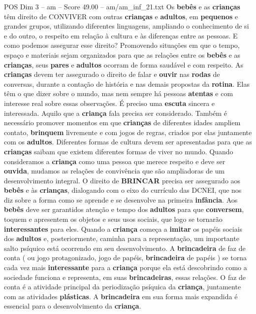 \begin{textsample}{POS Dim 3 – am – Score 49.00 – am/am\_inf\_21.txt}
Os \textbf{bebês} e as \textbf{crianças} têm direito de CONVIVER com outras \textbf{crianças} e \textbf{adultos}, em \textbf{pequenos} e grandes grupos, utilizando diferentes linguagens, ampliando o conhecimento de si e do outro, o respeito em relação à cultura e às diferenças entre as pessoas.
E como podemos assegurar esse direito?
Promovendo situações em que o tempo, espaço e materiais sejam organizados para que as relações entre os \textbf{bebês} e as \textbf{crianças}, seus \textbf{pares} e \textbf{adultos} ocorram de forma saudável e com respeito.
As \textbf{crianças} devem ter assegurado o direito de falar e \textbf{ouvir} nas \textbf{rodas} de conversas, durante a contação de história e nas demais propostas da \textbf{rotina}.
Elas têm o que dizer sobre o mundo, mas nem sempre há pessoas \textbf{atentas} e com interesse real sobre essas observações.
É preciso uma \textbf{escuta} sincera e interessada.
Aquilo que a \textbf{criança} fala precisa ser considerado.
Também é necessário promover momentos em que \textbf{crianças} de diferentes idades ampliem contato, \textbf{brinquem} livremente e com jogos de regras, criados por elas juntamente com os \textbf{adultos}.
Diferentes formas de cultura devem ser apresentadas para que as \textbf{crianças} saibam que existem diferentes formas de viver no mundo.
Quando consideramos a \textbf{criança} como uma pessoa que merece respeito e deve ser \textbf{ouvida}, mudamos as relações de convivência que são ampliadoras de um desenvolvimento integral.
O direito de \textbf{BRINCAR} precisa ser assegurado aos \textbf{bebês} e às \textbf{crianças}, dialogando com o eixo do currículo das DCNEI, que nos diz sobre a forma como se aprende e se desenvolve na primeira \textbf{infância}.
Aos \textbf{bebês} deve ser garantidos atenção e tempo dos \textbf{adultos} para que \textbf{conversem}, toquem e apresentem os objetos e seus usos sociais, que logo se tornarão \textbf{interessantes} para eles.
Quando a \textbf{criança} começa a \textbf{imitar} os papéis sociais dos \textbf{adultos} e, posteriormente, caminha para a representação, um importante salto psíquico está ocorrendo em seu desenvolvimento.
A \textbf{brincadeira} de faz de conta ( ou jogo protagonizado, jogo de papéis, \textbf{brincadeira} de papéis ) se torna cada vez mais \textbf{interessante} para a \textbf{criança} porque ela está descobrindo como a sociedade funciona e representa, em suas \textbf{brincadeiras}, essas relações.
O faz de conta é a atividade principal da periodização psíquica da \textbf{criança}, juntamente com as atividades \textbf{plásticas}.
A \textbf{brincadeira} em sua forma mais expandida é essencial para o desenvolvimento da \textbf{criança}.

\end{textsample}
